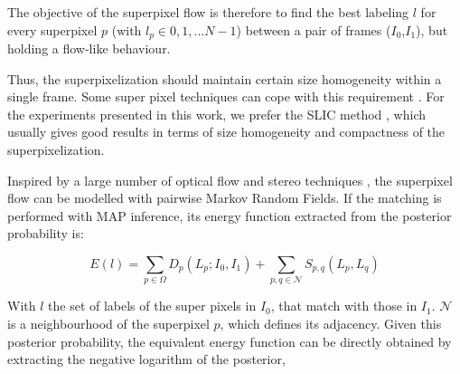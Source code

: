 The objective of the superpixel flow is therefore to find the best labeling $l$ for every superpixel $p$
(with $l_p \in {0,1,...N-1}$) between a pair of frames ($I_{0}$,$I_{1}$), but holding a flow-like behaviour.

Thus, the superpixelization should maintain certain size homogeneity within a single frame. Some super
pixel techniques can cope with this requirement \cite{c9}\cite{c10}. For the experiments presented 
in this work, we prefer the SLIC method \cite{c9}, which usually gives
good results in terms of size homogeneity and compactness of the superpixelization. 



Inspired by a large number of optical flow and stereo techniques \cite{c7}\cite{c12}\cite{c13}, 
the superpixel flow can be modelled with pairwise Markov Random Fields. If
the matching is performed with MAP inference, its energy function extracted from the posterior probability is: 


\begin{equation}
E(l) = \displaystyle \sum_{p \in \Omega} D_p(L_p;I_0,I_1) +
\sum_{p,q \in \mathcal{N}} S_{p,q}(L_p,L_q)
\label{eq_energy}
\end{equation}

With $l$ the set of labels of the super pixels in $I_0$,
that match with those in $I_1$.
$ \mathcal{N} $ is a neighbourhood of the
superpixel $p$, which defines its adjacency. Given this posterior probability,
the equivalent energy function can be directly obtained
by extracting the negative logarithm of the posterior,

